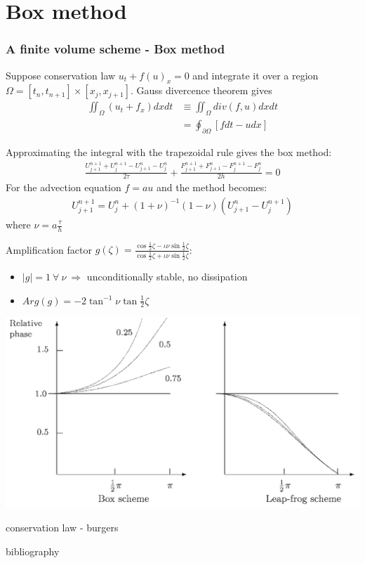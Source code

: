 \documentclass{beamer}
\begin{document}
\section{Box method}
\begin{frame}
\frametitle{A finite volume scheme - Box method}
Suppose conservation law $u_t + f(u)_x = 0$ and integrate it over a region $\Omega = [t_n,t_{n+1}] \times [x_j,x_{j+1}]$. Gauss divercence theorem gives
\begin{align*}
\iint_\Omega(u_t + f_x)dxdt & \equiv \iint_\Omega div(f,u)dxdt \\
& = \oint_{\partial\Omega}[fdt-udx]
\end{align*}
\end{frame}
\begin{frame}
Approximating the integral with the trapezoidal rule gives the box method:
\begin{align*}
\frac{U_{j+1}^{n+1} + U_j^{n+1} - U_{j + 1}^n - U_j^n}{2\tau} + \frac{F_{j+1}^{n+1} + F_{j+1}^n - F_j^{n+1} - F_j^n}{2h} = 0
\end{align*}
For the advection equation $f = au$ and the method becomes:
\begin{align*}
U_{j+1}^{n+1} = U_j^n + (1 + \nu)^{-1}(1 - \nu)(U_{j+1}^n - U_j^{n+1})
\end{align*}
where  $\nu =  a\frac{\tau}{h}$
\end{frame}
\begin{frame}
Amplification factor $g(\zeta) = \frac{\cos{\frac{1}{2}\zeta} - \iota\nu\sin{\frac{1}{2}\zeta}}{\cos{\frac{1}{2}\zeta} + \iota\nu\sin{\frac{1}{2}\zeta}}$:
\begin{itemize}
\setlength\itemsep{1em}
\item $|g| = 1 \ \forall \ \nu \ \Rightarrow$ unconditionally stable, no dissipation
\item $Arg(g) = -2\tan^{-1}{\nu\tan{\frac{1}{2}\zeta}}$
\end{itemize}
\end{frame}
\begin{frame}
\includegraphics[width=\textwidth]{lp_bx_lag}
\end{frame}
\begin{frame}
conservation law - burgers
\end{frame}
\begin{frame}
bibliography
\end{frame}
\end{document}
